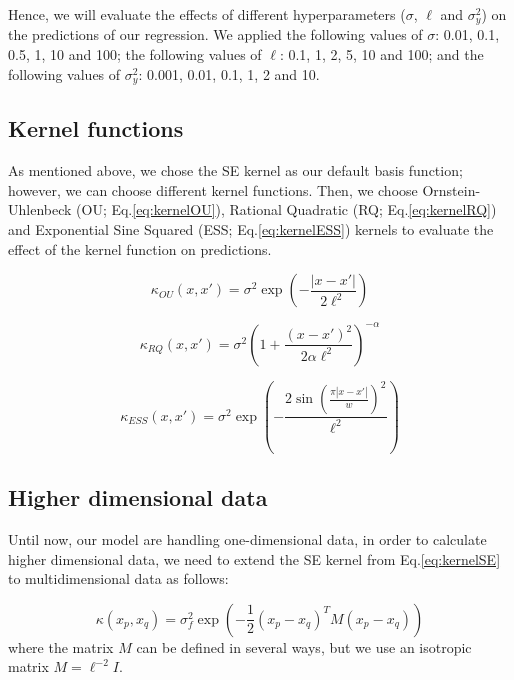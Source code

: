 \documentclass{article}
\begin{document}
Hence, we will evaluate the effects of different hyperparameters ($\sigma$, $\ell$ and $\sigma_y^2$) on the predictions of our regression. We applied the following values of $\sigma$: 0.01, 0.1, 0.5, 1, 10 and 100; the following values of $\ell$: 0.1, 1, 2, 5, 10 and 100; and the following values of $\sigma_y^2$: 0.001, 0.01, 0.1, 1, 2 and 10.

\subsection{Kernel functions}

As mentioned above, we chose the SE kernel as our default basis function; however, we can choose different kernel functions. Then, we choose Ornstein-Uhlenbeck (OU; Eq.\eqref{eq:kernelOU}), Rational Quadratic (RQ; Eq.\eqref{eq:kernelRQ}) and Exponential Sine Squared (ESS; Eq.\eqref{eq:kernelESS}) kernels to evaluate the effect of the kernel function on predictions.

\begin{equation}
  \label{eq:kernelOU}
  \kappa_{OU}(x,x') = \sigma^2 \exp{\left(-\frac{|x-x'|}{2\ell^2}\right)}  
\end{equation}

\begin{equation}
  \label{eq:kernelRQ}
  \kappa_{RQ}(x,x') = \sigma^2 \left(1 + \frac{(x-x')^2}{2\alpha\ell^2}\right)^{-\alpha}
\end{equation}

\begin{equation}
  \label{eq:kernelESS}
  \kappa_{ESS}(x,x') = \sigma^2 \exp{\left(-\frac{2\sin\left(\frac{\pi|x-x'|}{w}\right)^2}{\ell^2}\right)}
\end{equation}

\subsection{Higher dimensional data}

Until now, our model are handling one-dimensional data, in order to calculate higher dimensional data, we need to extend the SE kernel from Eq.\eqref{eq:kernelSE} to multidimensional data as follows:

\begin{equation}
  \kappa(x_p,x_q) = \sigma^2_f\exp{\left(-\frac{1}{2}(x_p - x_q)^TM(x_p - x_q)\right)}
  \label{eq:multi}
\end{equation}
where the matrix $M$ can be defined in several ways, but we use an isotropic matrix $M = \ell^{-2}I$.
\end{document}
